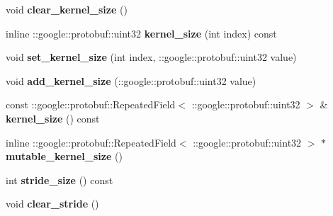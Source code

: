 \begin{DoxyCompactItemize}
\item 
\mbox{\label{classcaffe_1_1_convolution_parameter_a3dbcd939f5329365c177a9d8e3a17f31}} 
void {\bfseries clear\+\_\+kernel\+\_\+size} ()
\item 
\mbox{\label{classcaffe_1_1_convolution_parameter_af498a79b94c78906397e827021eeeda8}} 
inline \+::google\+::protobuf\+::uint32 {\bfseries kernel\+\_\+size} (int index) const
\item 
\mbox{\label{classcaffe_1_1_convolution_parameter_a88956e7c89eb71b5a2f3a778f7428387}} 
void {\bfseries set\+\_\+kernel\+\_\+size} (int index, \+::google\+::protobuf\+::uint32 value)
\item 
\mbox{\label{classcaffe_1_1_convolution_parameter_aaa98b98cdbc72345e22ddcdade4d247f}} 
void {\bfseries add\+\_\+kernel\+\_\+size} (\+::google\+::protobuf\+::uint32 value)
\item 
\mbox{\label{classcaffe_1_1_convolution_parameter_a99babc05cc97f4cc82ee2edba60a9764}} 
const \+::google\+::protobuf\+::\+Repeated\+Field$<$ \+::google\+::protobuf\+::uint32 $>$ \& {\bfseries kernel\+\_\+size} () const
\item 
\mbox{\label{classcaffe_1_1_convolution_parameter_a89fde3a2e5186537d4a0e4e1553a826d}} 
inline \+::google\+::protobuf\+::\+Repeated\+Field$<$ \+::google\+::protobuf\+::uint32 $>$ $\ast$ {\bfseries mutable\+\_\+kernel\+\_\+size} ()
\item 
\mbox{\label{classcaffe_1_1_convolution_parameter_ab343d5bbc6a10234e9ef545b31d10703}} 
int {\bfseries stride\+\_\+size} () const
\item 
\mbox{\label{classcaffe_1_1_convolution_parameter_a2ba50838c78b0de04c1afdf2916fd13d}} 
void {\bfseries clear\+\_\+stride} ()
\item 
\mbox{\label{classcaffe_1_1_convolution_parameter_ae9b3115e07bb32781a43851776a455eb}} 

\end{DoxyCompactItemize}
